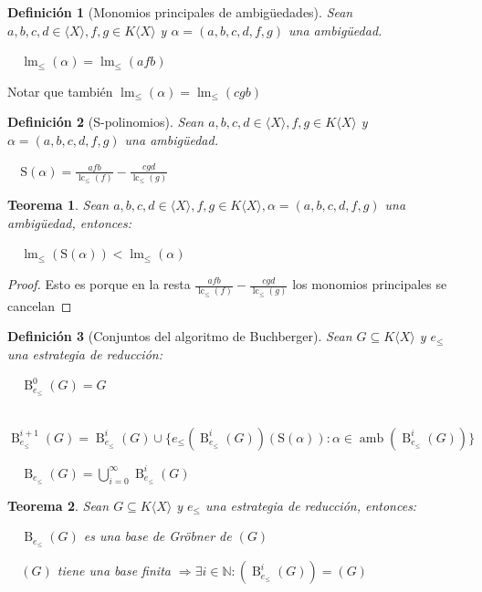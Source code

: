 \documentclass{amsbook}
\theoremstyle{customstyle}
\newtheorem{definition}{Definición}[section]
\newtheorem{theorem}{Teorema}[section]
\DeclareMathOperator{\lm}{lm}
\DeclareMathOperator{\lc}{lc}
\DeclareMathOperator{\amb}{amb}
\renewcommand{\S}{\text{S}}
\DeclareMathOperator{\B}{B}
\begin{document}
\begin{definition}[Monomios principales de ambigüedades]
Sean $a, b, c, d ∈ ⟨X⟩, f, g ∈ K⟨X⟩$ y $α = (a, b, c, d, f, g)$ una ambigüedad.

  $\lm_≤{(α)} = \lm_≤{(afb)}$
\end{definition}

Notar que también $\lm_≤{(α)} = \lm_≤{(cgb)}$

\begin{definition}[S-polinomios]
Sean $a, b, c, d ∈ ⟨X⟩, f, g ∈ K⟨X⟩$ y $α = (a, b, c, d, f, g)$ una ambigüedad.

  $\S(α) = \frac{afb}{\lc_≤{(f)}} - \frac{cgd}{\lc_≤{(g)}}$
\end{definition}

\begin{theorem}
Sean $a, b, c, d ∈ ⟨X⟩, f, g ∈ K⟨X⟩, α = (a, b, c, d, f, g)$ una ambigüedad, entonces:

  $\lm_≤{(\S(α))} < \lm_≤{(α)}$

\end{theorem}

\begin{proof}
Esto es porque en la resta $\frac{afb}{\lc_≤{(f)}} - \frac{cgd}{\lc_≤{(g)}}$ los monomios principales se cancelan
\end{proof}


\begin{definition}[Conjuntos del algoritmo de Buchberger]
Sean $G ⊆ K⟨X⟩$ y $e_≤$ una estrategia de reducción:

  $\B_{e_≤}^0(G) = G$

  $\B_{e_≤}^{i + 1}(G) = \B_{e_≤}^i(G) ∪ \{e_≤(\B_{e_≤}^i(G))(\S(α)) : α ∈ \amb(\B_{e_≤}^i(G))\}$

  $\B_{e_≤}(G) = \bigcup_{i = 0}^∞ \B_{e_≤}^i(G)$

\end{definition}

\begin{theorem}
  Sean $G ⊆ K⟨X⟩$ y $e_≤$ una estrategia de reducción, entonces:

  $\B_{e_≤}(G)$ es una base de Gröbner de $(G)$

  $(G)$ tiene una base finita $⇒ ∃i ∈ ℕ : (\B_{e_≤}^i(G)) = (G)$
\end{theorem}



\end{document}
